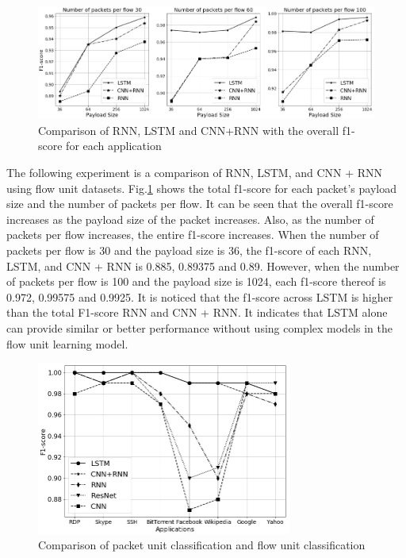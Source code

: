 \begin{figure}[h]
\centering
{
\includegraphics[scale=0.5]{fig9.jpg}
\caption{Comparison of RNN, LSTM and CNN+RNN with the overall f1-score for each application}
\label{fig9}
}
\end{figure}

The following experiment is a comparison of RNN, LSTM, and CNN + RNN using flow unit datasets.
Fig.\ref{fig9} shows the total f1-score for each packet's payload size and the number of packets per flow.
It can be seen that the overall f1-score increases as the payload size of the packet increases.
Also, as the number of packets per flow increases, the entire f1-score increases.
When the number of packets per flow is 30 and the payload size is 36, the f1-score of each RNN, LSTM, and CNN + RNN is 0.885, 0.89375 and 0.89.
However, when the number of packets per flow is 100 and the payload size is 1024, each f1-score thereof is 0.972, 0.99575 and 0.9925.
It is noticed that the f1-score across LSTM is higher than the total F1-score RNN and CNN + RNN.
It indicates that LSTM alone can provide similar or better performance without using complex models in the flow unit learning model.

\begin{figure}[t]
\centering
{
\includegraphics[width=3.3in]{fig10.jpg}
\caption{Comparison of packet unit classification and flow unit classification}
\label{fig10}
}
\end{figure}

